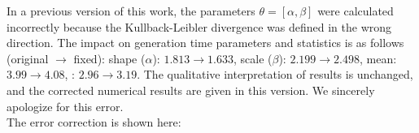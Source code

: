 In a previous version of this work,
the parameters $\theta = [\alpha, \beta]$ were calculated incorrectly
because the Kullback-Leibler divergence was defined in the wrong direction.
The impact on generation time parameters and statistics is as follows
(original $\rightarrow$ fixed):
shape ($\alpha$): $1.813 \rightarrow 1.633$,
scale ($\beta$): $2.199 \rightarrow 2.498$,
mean: $3.99 \rightarrow 4.08$,
\sd: $2.96 \rightarrow 3.19$.
The qualitative interpretation of results is unchanged,
and the corrected numerical results are given in this version.
We sincerely apologize for this error.\\
The error correction is shown here:
\scriptsize{}
